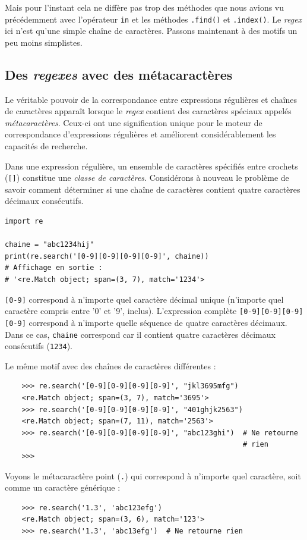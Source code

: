 \documentclass[a4paper,12pt]{book}
\begin{document}
Mais pour l'instant cela ne diffère pas trop des méthodes que nous avions vu précédemment avec l'opérateur \texttt{in} et les méthodes \texttt{.find()} et \texttt{.index()}. Le \textit{regex} ici n'est qu'une simple chaîne de caractères. Passons maintenant à des motifs un peu moins simplistes.
\medskip

\subsection*{Des \textit{regexes} avec des métacaractères}
Le véritable pouvoir de la correspondance entre expressions régulières et chaînes de caractères apparaît lorsque le \textit{regex} contient des caractères spéciaux appelés \textit{métacaractères}. Ceux-ci ont une signification unique pour le moteur de correspondance d’expressions régulières et améliorent considérablement les capacités de recherche.
\medskip

Dans une expression régulière, un ensemble de caractères spécifiés entre crochets (\texttt{[]}) constitue une \textit{classe de caractères}. Considérons à nouveau le problème de savoir comment déterminer si une chaîne de caractères contient quatre caractères décimaux consécutifs.
\begin{lstlisting}
import re

chaine = "abc1234hij"
print(re.search('[0-9][0-9][0-9][0-9]', chaine))
# Affichage en sortie : 
# '<re.Match object; span=(3, 7), match='1234'>
\end{lstlisting}
\medskip

\texttt{[0-9]} correspond à n'importe quel caractère décimal unique (n'importe quel caractère compris entre '0' et '9', inclus). L'expression complète \texttt{[0-9][0-9][0-9][0-9]} correspond à n'importe quelle séquence de quatre caractères décimaux. Dans ce cas, \texttt{chaine} correspond car il contient quatre caractères décimaux consécutifs (\texttt{1234}).
\medskip

Le même motif avec des chaînes de caractères différentes :
\begin{verbatim}
    >>> re.search('[0-9][0-9][0-9][0-9]', "jkl3695mfg")
    <re.Match object; span=(3, 7), match='3695'>
    >>> re.search('[0-9][0-9][0-9][0-9]', "401ghjk2563")
    <re.Match object; span=(7, 11), match='2563'>
    >>> re.search('[0-9][0-9][0-9][0-9]', "abc123ghi")  # Ne retourne 
                                                        # rien
    >>>
\end{verbatim}
\medskip

Voyons le métacaractère point (\texttt{.}) qui correspond à n'importe quel caractère, soit comme un caractère générique :
\begin{verbatim}
    >>> re.search('1.3', 'abc123efg')
    <re.Match object; span=(3, 6), match='123'>
    >>> re.search('1.3', 'abc13efg')  # Ne retourne rien
\end{verbatim}
\medskip
\end{document}
